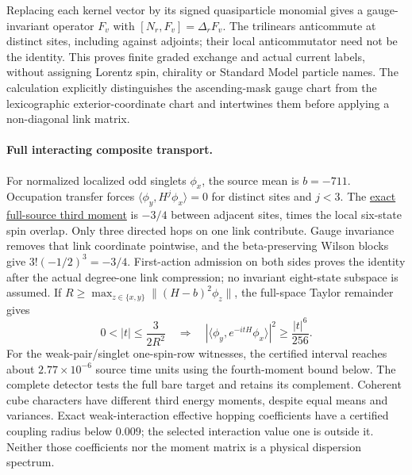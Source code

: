 Replacing each kernel vector by its signed quasiparticle monomial gives
a gauge-invariant operator $F_v$ with $[N_r,F_v]=\Delta_r F_v$.
The trilinears anticommute at distinct sites, including against adjoints;
their local anticommutator need not be the identity. This proves finite
graded exchange and actual current labels, without assigning Lorentz spin,
chirality or Standard Model particle names. The calculation explicitly
distinguishes the ascending-mask gauge chart from the lexicographic
exterior-coordinate chart and intertwines them before applying a
non-diagonal link matrix.

\paragraph{Full interacting composite transport.}
For normalized localized odd singlets $\phi_x$, the source mean is
$b=-711$. Occupation transfer forces
$\langle\phi_y,H^j\phi_x\rangle=0$ for distinct sites and $j<3$.
The \href{https://github.com/FloatingPragma/observer-patch-holography/blob/main/model/particle_primary_composite_transport/PROOF.md}{exact full-source third moment}
is $-3/4$ between adjacent sites, times the local six-state spin overlap.
Only three directed hops on one link contribute. Gauge invariance removes
that link coordinate pointwise, and the beta-preserving Wilson blocks
give $3!(-1/2)^3=-3/4$. First-action admission on both sides proves the
identity after the actual degree-one link compression; no invariant
eight-state subspace is assumed.
If $R\ge\max_{z\in\{x,y\}}\|(H-b)^2\phi_z\|$, the full-space Taylor remainder gives
\[
 0<|t|\le\frac{3}{2R^2}
 \quad\Longrightarrow\quad
 |\langle\phi_y,e^{-itH}\phi_x\rangle|^2\ge\frac{|t|^6}{256}.
\]
For the weak-pair/singlet one-spin-row witnesses, the certified interval reaches about
$2.77\times10^{-6}$ source time units using the fourth-moment bound below.
The complete detector tests the full bare target and retains its
complement. Coherent cube characters have different third energy moments,
despite equal means and variances. Exact weak-interaction effective
hopping coefficients have a certified coupling radius below $0.009$;
the selected interaction value one is outside it. Neither those
coefficients nor the moment matrix is a physical dispersion spectrum.

